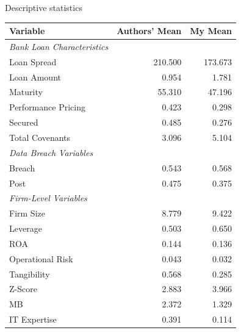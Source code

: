 \documentclass[13pt]{beamer}
\begin{document}
\begin{frame}
  {Descriptive statistics}
  \scriptsize
  \begin{table}[ht]
    \centering
    \begin{tabular}{@{}lrr@{}}
      Variable                           & \textbf{Authors' Mean} & \textbf{My Mean} \\
      \midrule
      \textit{Bank Loan Characteristics} &                        &                  \\
      \quad Loan Spread                  & 210.500                & 173.673          \\
      \quad Loan Amount                  & 0.954                  & 1.781            \\
      \quad Maturity                     & 55.310                 & 47.196           \\
      \quad Performance Pricing          & 0.423                  & 0.298            \\
      \quad Secured                      & 0.485                  & 0.276            \\
      \quad Total Covenants              & 3.096                  & 5.104            \\

      \textit{Data Breach Variables}     &                        &                  \\
      \quad Breach                       & 0.543                  & 0.568            \\
      \quad Post                         & 0.475                  & 0.375            \\

      \textit{Firm-Level Variables}      &                        &                  \\
      \quad Firm Size                    & 8.779                  & 9.422            \\
      \quad Leverage                     & 0.503                  & 0.650            \\
      \quad          ROA                 & 0.144                  & 0.136            \\
      \quad Operational Risk             & 0.043                  & 0.032            \\
      \quad Tangibility                  & 0.568                  & 0.285            \\
      \quad Z-Score                      & 2.883                  & 3.966            \\
      \quad MB                           & 2.372                  & 1.329            \\
      \quad IT Expertise                 & 0.391                  & 0.114            \\
    \end{tabular}
  \end{table}
\end{frame}
\end{document}
